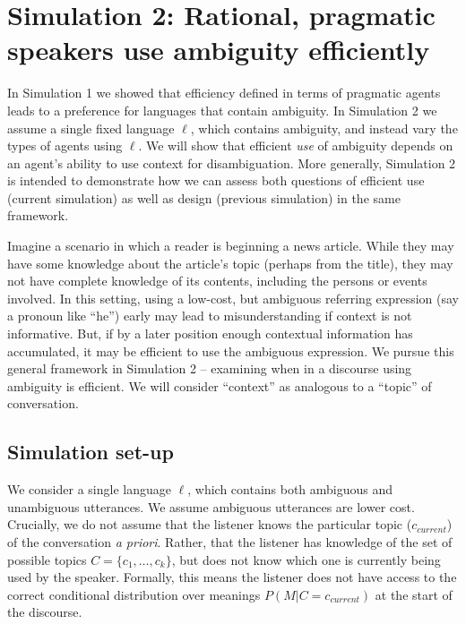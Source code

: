 \documentclass[10pt, letterpaper]{article}
\begin{document}
\section{Simulation 2: Rational, pragmatic speakers use ambiguity
efficiently}\label{simulation-2-rational-pragmatic-speakers-use-ambiguity-efficiently}

In Simulation 1 we showed that efficiency defined in terms of pragmatic
agents leads to a preference for languages that contain ambiguity. In
Simulation 2 we assume a single fixed language \(\ell\), which contains
ambiguity, and instead vary the types of agents using \(\ell\). We will
show that efficient \emph{use} of ambiguity depends on an agent's
ability to use context for disambiguation. More generally, Simulation 2
is intended to demonstrate how we can assess both questions of efficient
use (current simulation) as well as design (previous simulation) in the
same framework.\par

Imagine a scenario in which a reader is beginning a news article. While
they may have some knowledge about the article's topic (perhaps from the
title), they may not have complete knowledge of its contents, including
the persons or events involved. In this setting, using a low-cost, but
ambiguous referring expression (say a pronoun like ``he'') early may
lead to misunderstanding if context is not informative. But, if by a
later position enough contextual information has accumulated, it may be
efficient to use the ambiguous expression. We pursue this general
framework in Simulation 2 -- examining when in a discourse using
ambiguity is efficient. We will consider ``context'' as analogous to a
``topic'' of conversation. \par

\subsection{Simulation set-up}\label{simulation-set-up-1}

We consider a single language \(\ell\), which contains both ambiguous
and unambiguous utterances. We assume ambiguous utterances are lower
cost. Crucially, we do not assume that the listener knows the particular
topic (\(c_{current}\)) of the conversation \textit{a priori}. Rather,
that the listener has knowledge of the set of possible topics
\(C = \{c_1, \dots, c_k\}\), but does not know which one is currently
being used by the speaker. Formally, this means the listener does not
have access to the correct conditional distribution over meanings
\(P(M|C=c_{current})\) at the start of the discourse.\par 
\end{document}
